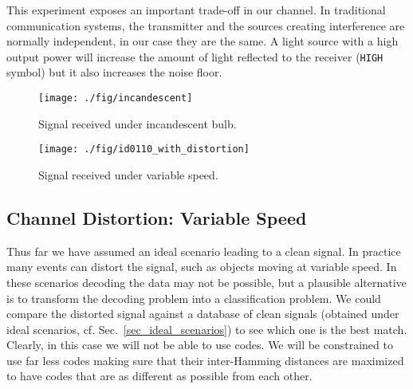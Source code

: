 \documentclass[10pt]{sig-alternate-05-2015}
\begin{document}
{This experiment exposes an important trade-off in our channel. In traditional communication systems, the transmitter and the sources creating interference are normally independent, in our case they are the same. A light source with a high output power will increase the amount of light reflected to the receiver (\texttt{HIGH} symbol) but it also increases the noise floor.

\begin{figure}[!t]
	\begin{minipage}[t]{0.485\linewidth}
		\texttt{[image: ./fig/incandescent]}
		\vspace{-6mm}
		\caption{Signal received \newline under incandescent bulb.}
		\label{fig_incandescent}
	\end{minipage}\hfill \begin{minipage}[t]{.485\linewidth}
		\texttt{[image: ./fig/id0110\_with\_distortion]}
		\vspace{-6mm}
		\caption{Signal received \newline under variable speed.}
		\label{fig_id_with_distortion}
	\end{minipage} 
	\vspace{-4mm}
\end{figure}

\subsection{Channel Distortion: Variable Speed}
Thus far we have assumed an ideal scenario leading to a clean signal. In practice many events can distort the signal, such as objects moving at variable speed.
In these scenarios decoding the data may not be possible, but a plausible alternative is to transform the decoding problem into a classification problem.
We could compare the distorted signal against a database of clean signals (obtained under ideal scenarios, cf. Sec.~\ref{sec_ideal_scenarios}) to see which one is the best match. Clearly, in this case we will not be able to use  codes. We will be constrained to use far less codes making sure that their inter-Hamming distances are maximized to have codes that are as different as possible from each other. 

}
\end{document}
